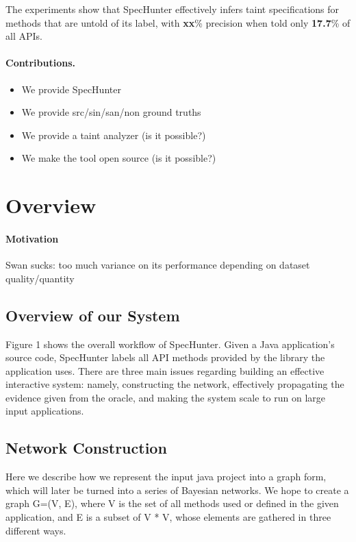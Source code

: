 \documentclass[sigconf,review,anonymous]{acmart}\settopmatter{printfolios=true,printccs=false,printacmref=false}
\begin{document}
The experiments show that SpecHunter effectively infers taint specifications for
methods that are untold of its label, with \textbf{xx}\% precision when told only
\textbf{17.7}\% of all APIs.


\paragraph{Contributions.}

\begin{itemize}
  \item We provide SpecHunter
  \item We provide src/sin/san/non ground truths
  \item We provide a taint analyzer (is it possible?)
  \item We make the tool open source (is it possible?)
\end{itemize}

\section{Overview}

\paragraph{Motivation}

Swan sucks: too much variance on its performance depending on dataset quality/quantity

\subsection{Overview of our System}


Figure 1 shows the overall workflow of SpecHunter. Given a Java application's
source code, SpecHunter labels all API methods provided by the library the application
uses. There are three main issues regarding building an effective interactive system:
namely, constructing the network, effectively propagating the evidence given from the
oracle, and making the system scale to run on large input applications.

\subsection{Network Construction}

Here we describe how we represent the input java project into a graph form, which will
later be turned into a series of Bayesian networks. We hope to create a graph G=(V, E),
where V is the set of all methods used or defined in the given application, and E is a
subset of V * V, whose elements are gathered in three different ways.
\end{document}
